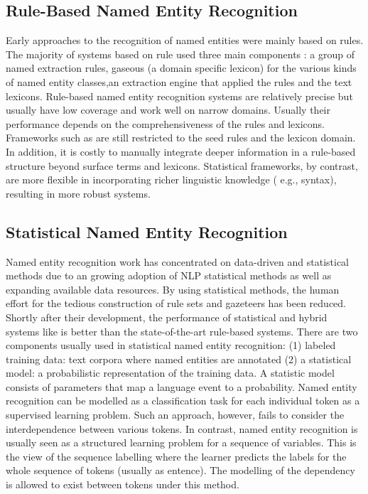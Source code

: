 \subsection{Rule-Based Named Entity Recognition}
Early approaches to the recognition of named entities were mainly based on rules. The majority of systems based on rule used three main components : a group of named extraction rules, gaseous (a domain specific lexicon) for the various kinds of named entity classes,an extraction engine that applied the rules and the text lexicons.\cite{zitouni2014natural} Rule-based named entity recognition systems are relatively precise but usually have low coverage and work well on narrow domains. Usually their performance depends on the comprehensiveness of the rules and lexicons. Frameworks such as \cite{riloff2004introduction} are still restricted to the seed rules and the lexicon domain. In addition, it is costly to manually integrate deeper information in a rule-based structure beyond surface terms and lexicons. Statistical frameworks, by contrast, are more flexible in incorporating richer linguistic knowledge ( e.g., syntax), resulting in more robust systems.
\subsection{Statistical Named Entity Recognition}
Named entity recognition work has concentrated on data-driven and statistical methods due to an growing adoption of NLP statistical methods as well as expanding available data resources. By using statistical methods, the human effort for the tedious construction of rule sets and gazeteers has been reduced. Shortly after their development, the performance of statistical and hybrid systems like \cite{mikheev1999named}\cite{miller1998bbn} is better than the state-of-the-art rule-based systems. There are two components usually used in statistical named entity recognition: (1) labeled training data: text corpora where named entities are annotated  (2) a statistical model: a probabilistic representation of the training data. A statistic model consists of parameters that map a  language event to a probability.
Named entity recognition can be modelled as a classification task for each individual token as a supervised learning problem. Such an approach, however, fails to consider the interdependence between various tokens. In contrast, named entity recognition is usually seen as a structured learning problem for a sequence of variables. This is the view of the sequence labelling where the learner predicts the labels for the whole sequence of tokens (usually as entence). The modelling of the dependency is allowed to exist between tokens under this method\cite{zitouni2014natural}.

